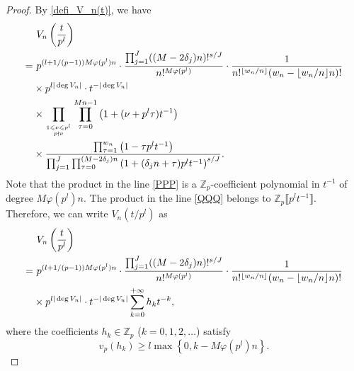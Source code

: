 \documentclass[12pt]{article}
\numberwithin{equation}{section}
\begin{document}
\begin{proof}
By \eqref{defi_V_n(t)}, we have
\begin{align}
&~ V_n\left( \frac{t}{p^l} \right) \notag\\
=&~ p^{(l+1/(p-1))M\varphi(p^{l})n} \cdot \frac{\prod_{j=1}^{J} ((M-2\delta_j)n)!^{s/J}}{n!^{M\varphi(p^{l})}} \cdot \frac{1}{n!^{\lfloor w_n / n\rfloor}(w_n-\lfloor w_n / n\rfloor n)!} \notag \\
&\times p^{l|\deg V_n|} \cdot t^{-|\deg V_n|} \notag\\
&\times \prod_{1 \leqslant \nu \leqslant p^l \atop p \nmid \nu}\prod_{\tau=0}^{Mn-1} \left( 1+(\nu+p^l\tau)t^{-1} \right) \label{PPP}\\
&\times \frac{\prod_{\tau=1}^{w_n}\left( 1 -\tau p^{l} t^{-1} \right)}{\prod_{j=1}^{J}\prod_{\tau=0}^{(M-2\delta_j)n}\left( 1+(\delta_j n + \tau)p^{l} t^{-1} \right)^{s/J}}. \label{QQQ}
\end{align}
Note that the product in the line \eqref{PPP} is a $\mathbb{Z}_p$-coefficient polynomial in $t^{-1}$ of degree $M\varphi(p^l)n$. The product in the line \eqref{QQQ} belongs to $\mathbb{Z}_p\llbracket p^{l}t^{-1} \rrbracket$. Therefore, we can write $V_n(t/p^{l})$ as 
\begin{align}
&~ V_n\left( \frac{t}{p^l} \right) \notag\\
=&~ p^{(l+1/(p-1))M\varphi(p^{l})n} \cdot \frac{\prod_{j=1}^{J} ((M-2\delta_j)n)!^{s/J}}{n!^{M\varphi(p^{l})}} \cdot \frac{1}{n!^{\lfloor w_n / n\rfloor}(w_n-\lfloor w_n / n\rfloor n)!} \notag \\
&\times p^{l|\deg V_n|} \cdot t^{-|\deg V_n|} \sum_{k=0}^{+\infty} h_k t^{-k}, \label{V_n(t/p^l)_in_t^-1}
\end{align}
where the coefficients $h_k \in \mathbb{Z}_p$ ($k=0,1,2,\ldots$) satisfy
\begin{equation}\label{v_p(h_k)}
v_p(h_k) \geqslant l \max\left\{ 0, k - M\varphi(p^l)n \right\}. 
\end{equation} 


\end{proof}
\end{document}
